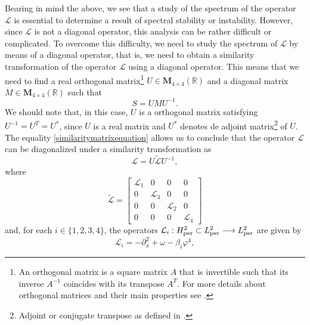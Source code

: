 \documentclass[10pt,reqno,a4paper]{amsart} %
\theoremstyle{definition} %
\numberwithin{equation}{section}
\numberwithin{figure}{section}
\begin{document}
Bearing in mind the above, we see that a study of the spectrum of the operator $\mathcal{L}$ is essential to determine a result of spectral stability or instability. However, since $\mathcal{L}$ is not a diagonal operator, this analysis can be rather difficult or complicated. To overcome this difficulty, we need to study the spectrum of $\mathcal{L}$ by means of a diagonal operator, that is, we need to obtain a similarity transformation of the operator $\mathcal{L}$ using a diagonal operator. This means that we need to find a real orthogonal matrix\footnote{An orthogonal matrix is a square matrix $A$ that is invertible such that its inverse $A^{-1}$ coincides with its transpose $A^T$. For more details about orthogonal matrices and their main properties see \cite[Section 4.6]{Williams}.} %
 $U\in \mathbf{M}_{4 \times 4}(\mathbb{R})$ and a diagonal matrix $M\in \mathbf{M}_{4 \times 4}(\mathbb{R})$ such that
\begin{equation}\label{similaritymatrixequation}
S= U  M  U^{-1}.   
\end{equation}
We should note that, in this case, $U$ is a orthogonal matrix satisfying $U^{-1}=U^T=U^*$, since $U$ is a real matrix and $U^*$ denotes de adjoint matrix\footnote{Adjoint or conjugate transpose as defined in \cite[Section 6.1]{Friedberg}.} of $U$. The equality \eqref{similaritymatrixequation} allows us to conclude that the operator $\mathcal{L}$ can be diagonalized
 under a similarity transformation as
\begin{equation}\label{auxiliarylinearizedoperatorrelation}
    \mathcal{L}= U \widetilde{\mathcal{L}} U^{-1},
\end{equation}
where
\begin{equation}\label{auxiliarylinearizedoperatordefinition}
 \widetilde{\mathcal{L}}= \begin{bmatrix}
\mathcal{L}_1 & 0 & 0 & 0 \nonumber\\
0 & \mathcal{L}_3 & 0 & 0 \nonumber\\
0 & 0 & \mathcal{L}_2 & 0 \nonumber\\
0 & 0 & 0 & \mathcal{L}_4
\end{bmatrix}
\end{equation}
and, for each $i \in \{1,2,3,4\}$, the operators $\mathcal{L}_i:H^2_{\rm per} \subset L^2_{\rm per} \longrightarrow L^2_{\rm per}$ are given by
\begin{equation}\label{HillOperators}
\mathcal{L}_i = -\partial_x^2 + \omega - \beta_i \varphi^4,
\end{equation}
\end{document}
